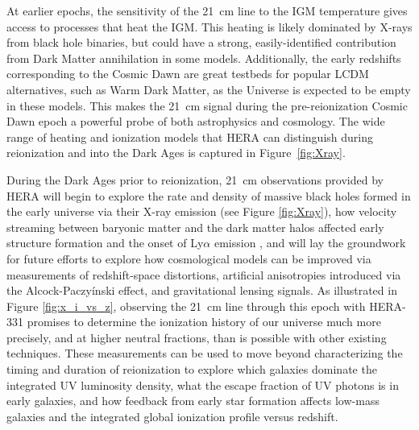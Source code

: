 \documentclass[preprint]{aastex}
\begin{document}
At earlier epochs, the sensitivity of the 21~cm line to the IGM temperature gives access to 
processes that heat the IGM.  This heating is likely dominated by X-rays from black
hole binaries, but could have a strong, easily-identified contribution from
Dark Matter annihilation in some models.  Additionally, the early redshifts
corresponding to the Cosmic Dawn are great testbeds for popular LCDM
alternatives, such as Warm Dark Matter, as the Universe is expected to be empty
in these models.  This makes the 21~cm signal during the pre-reionization Cosmic
Dawn epoch a powerful probe of both astrophysics and cosmology.
The wide range of heating and ionization models that HERA
can distinguish during reionization and into the Dark Ages is captured in
Figure~\ref{fig:Xray}.  

During the Dark Ages prior to reionization, 21~cm observations provided by HERA
will begin to explore the rate and density of massive black holes formed in the
early universe \citep{pritchard_loeb2010} via their X-ray emission (see Figure \ref{fig:Xray}), 
how velocity streaming between baryonic 
matter and the dark matter halos affected early structure formation and the onset
of Ly$\alpha$ emission \citep{visbal_et_al2012}, and will lay the groundwork for future
efforts to explore how 
cosmological models can be improved via measurements of redshift-space distortions,
artificial anisotropies introduced via the Alcock-Paczy\'inski effect, and
gravitational lensing signals\citep{furlanetto_et_al2006}.
As illustrated in Figure \ref{fig:x_i_vs_z}, observing the 21~cm line 
through this epoch with HERA-331 
promises to determine the ionization history of our universe much more precisely,
and at higher neutral fractions, than is possible with other existing techniques.  These measurements can
be used to move beyond characterizing the timing and duration of reionization to
explore which galaxies dominate the integrated UV luminosity density, what the escape fraction
of UV photons is in early galaxies, and how feedback from early star formation affects low-mass galaxies and the integrated 
global ionization profile versus
redshift. 
\end{document}
